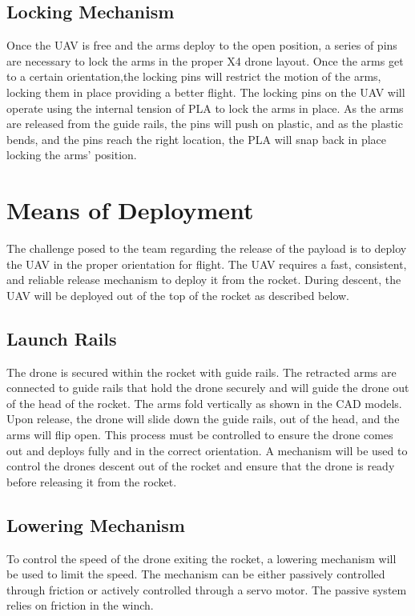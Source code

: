 	\subsection{Locking Mechanism}
    Once the UAV is free and the arms deploy to the open position, a series of pins are necessary to lock the arms in the proper X4 drone layout.  Once the arms get to a certain orientation,the locking pins will restrict the motion of the arms, locking them in place providing a better flight.  The locking pins on the UAV will operate using the internal tension of PLA to lock the arms in place.  As the arms are released from the guide rails, the pins will push on plastic, and as the plastic bends, and the pins reach the right location, the PLA will snap back in place locking the arms’ position.   


\section{Means of Deployment}\label{PL:Tradeoffs:Deployment}
	The challenge posed to the team regarding the release of the payload is to deploy the UAV in the proper orientation for flight. The UAV requires a fast, consistent, and reliable release mechanism to deploy it from the rocket. During descent, the UAV will be deployed out of the top of the rocket as described below. 

	\subsection{Launch Rails}
		The drone is secured within the rocket with guide rails. The retracted arms are connected to guide rails that hold the drone securely and will guide the drone out of the head of the rocket. The arms fold vertically as shown in the CAD models. Upon release, the drone will slide down the guide rails, out of the head, and the arms will flip open. This process must be controlled to ensure the drone comes out and deploys fully and in the correct orientation. A mechanism will be used to control the drones descent out of the rocket and ensure that the drone is ready before releasing it from the rocket.

	\subsection{Lowering Mechanism}
		To control the speed of the drone exiting the rocket, a lowering mechanism will be used to limit the speed. The mechanism can be either passively controlled through friction or actively controlled through a servo motor. The passive system relies on friction in the winch. 

